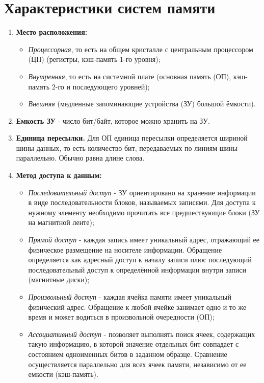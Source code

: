 \section{Характеристики систем памяти}
\begin{enumerate}
  \item\textbf{ Место расположения:}
  \begin{itemize}
    \item \emph{Процессорная}, то есть на общем кристалле с центральным процессором (ЦП) (регистры, кэш-память 1-го уровня);
    \item \emph{Внутренняя}, то есть на системной плате (основная память (ОП), кэш-память 2-го и последующего уровней);
    \item \emph{Внешняя} (медленные запоминающие устройства (ЗУ) большой ёмкости).
  \end{itemize}
  \item \textbf{Емкость ЗУ} - число бит/байт, которое можно хранить на ЗУ.
  \item \textbf{Единица пересылки.} Для ОП единица пересылки определяется шириной шины данных, то есть количество бит, передаваемых по линиям шины параллельно. Обычно равна длине слова.
  \item \textbf{Метод доступа к данным:}
  \begin{itemize}
    \item \emph{Последовательный доступ} - ЗУ ориентировано на хранение информации в виде последовательности блоков, называемых записями. Для доступа к нужному элементу необходимо прочитать все предшествующие блоки (ЗУ на магнитной ленте);
    \item \emph{Прямой доступ} - каждая запись имеет уникальный адрес, отражающий ее физическое размещение на носителе информации. Обращение определяется как адресный доступ к началу записи плюс последующий последовательный доступ к определённой информации внутри записи (магнитные диски);
    \item \emph{Произвольный доступ} - каждая ячейка памяти имеет уникальный физический адрес. Обращение к любой ячейке занимает одно и то же время и может водиться в произвольной очередности (ОП);
    \item \emph{Ассоциативный доступ} - позволяет выполнять поиск ячеек, содержащих такую информацию, в которой значение отдельных бит совпадает с состоянием одноименных битов в заданном образце. Сравнение осуществляется параллельно для всех ячеек памяти, независимо от ее емкости (кэш-память).
  \end{itemize}

\end{enumerate}
